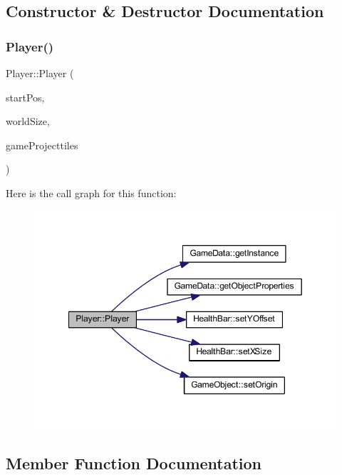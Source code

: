 \subsection{Constructor \& Destructor Documentation}
\mbox{\label{class_player_a64fb9eae1f16453837b951b04078d8af}} 
\subsubsection{\texorpdfstring{Player()}{Player()}}
{\footnotesize\ttfamily Player\+::\+Player (\begin{DoxyParamCaption}\item[{const sf\+::\+Vector2f \&}]{start\+Pos,  }\item[{const sf\+::\+Vector2f \&}]{world\+Size,  }\item[{\hyperlink{class_player_a2678e391270a5e0fd6c77127657cb4d7}{Game\+Object\+Ptr\+Vector} \&}]{game\+Projecttiles }\end{DoxyParamCaption})}

Here is the call graph for this function\+:
\nopagebreak
\begin{figure}[H]
\begin{center}
\leavevmode
\includegraphics[width=349pt]{class_player_a64fb9eae1f16453837b951b04078d8af_cgraph}
\end{center}
\end{figure}


\subsection{Member Function Documentation}
\mbox{\label{class_player_a19c3b63145b64941430d4362d2a32129}} 
